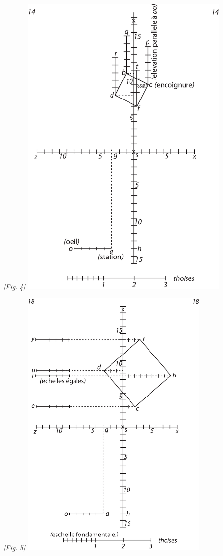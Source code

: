 \begin{center}
\\\textit{[Fig. 4]}
\protect\clearpage
\includegraphics[width=0.78\textwidth]{images/T14-Desargues}
\\\rule[-4mm]{0mm}{10mm}\textit{[Fig. 5]}
\protect\clearpage
\includegraphics[width=0.7\textwidth]{images/T18-Desargues}

\end{center}
